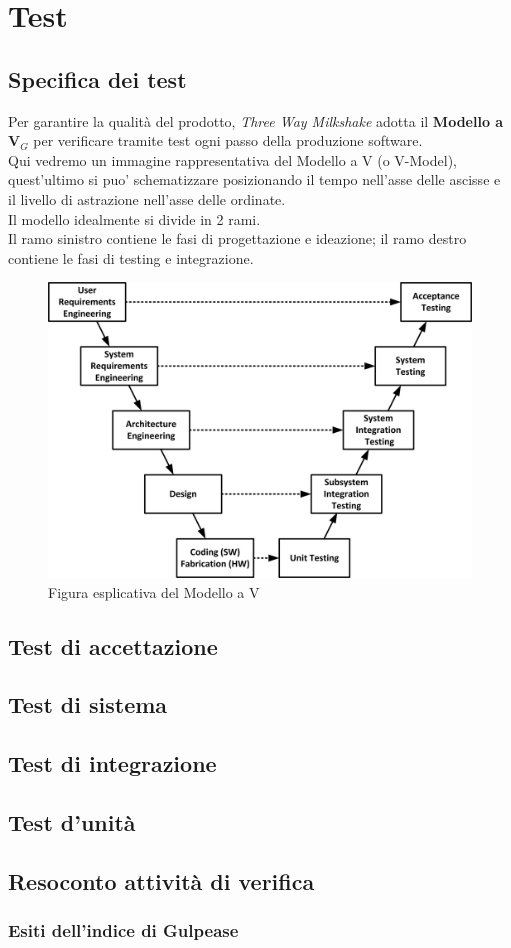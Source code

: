 \section{Test}

\subsection{Specifica dei test}

Per garantire la qualità del prodotto, \textit{Three Way Milkshake} adotta il \textbf{Modello a V}$_G$ per verificare tramite test ogni passo della produzione software.\\Qui vedremo un immagine rappresentativa del Modello a V (o V-Model), quest'ultimo si puo' schematizzare posizionando il tempo nell'asse delle ascisse e il livello di astrazione nell'asse delle ordinate.\\Il modello idealmente si divide in 2 rami.\\Il ramo sinistro contiene le fasi di progettazione e ideazione; il ramo destro contiene le fasi di testing e integrazione.
\begin{figure}[h!]
	\centering
	\includegraphics[scale=0.6]{res/images/v_model.jpg}
	\caption{Figura esplicativa del Modello a V}
\end{figure}

\subsection{Test di accettazione}

\subsection{Test di sistema}

\subsection{Test di integrazione}

\subsection{Test d'unità}

\subsection{Resoconto attività di verifica}
\subsubsection{Esiti dell'indice di Gulpease}
